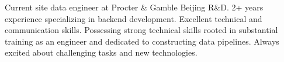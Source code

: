 

\begin{cvparagraph}

Current site data engineer at Procter \& Gamble Beijing R\&D. 2+ years experience specializing in backend development. Excellent technical and communication skills. Possessing strong technical skills rooted in substantial training as an engineer and dedicated to constructing data pipelines. Always excited about challenging tasks and new technologies.
\end{cvparagraph}
